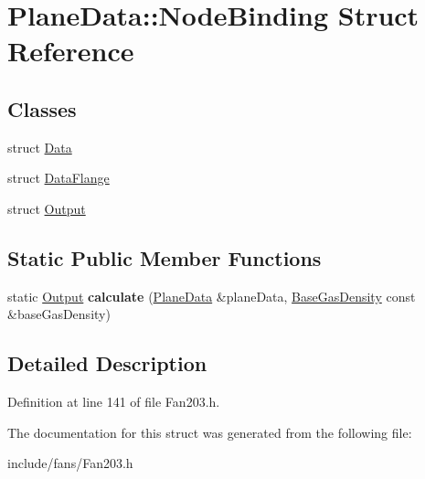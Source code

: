 \hypertarget{struct_plane_data_1_1_node_binding}{}\section{Plane\+Data\+:\+:Node\+Binding Struct Reference}
\label{struct_plane_data_1_1_node_binding}
\subsection*{Classes}
\begin{DoxyCompactItemize}
\item 
struct \hyperlink{struct_plane_data_1_1_node_binding_1_1_data}{Data}
\item 
struct \hyperlink{struct_plane_data_1_1_node_binding_1_1_data_flange}{Data\+Flange}
\item 
struct \hyperlink{struct_plane_data_1_1_node_binding_1_1_output}{Output}
\end{DoxyCompactItemize}
\subsection*{Static Public Member Functions}
\begin{DoxyCompactItemize}
\item 
\mbox{\label{struct_plane_data_1_1_node_binding_a50084489fc0b1ad5048226c2f04e1d49}} 
static \hyperlink{struct_plane_data_1_1_node_binding_1_1_output}{Output} {\bfseries calculate} (\hyperlink{class_plane_data}{Plane\+Data} \&plane\+Data, \hyperlink{class_base_gas_density}{Base\+Gas\+Density} const \&base\+Gas\+Density)
\end{DoxyCompactItemize}


\subsection{Detailed Description}


Definition at line 141 of file Fan203.\+h.



The documentation for this struct was generated from the following file\+:\begin{DoxyCompactItemize}
\item 
include/fans/Fan203.\+h\end{DoxyCompactItemize}

